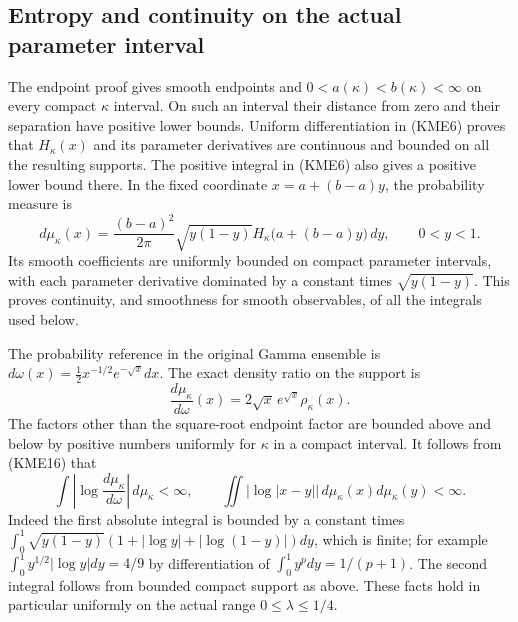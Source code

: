 \documentclass[11pt,a4paper]{article}
\begin{document}
\subsection{Entropy and continuity on the actual parameter interval}
The endpoint proof gives smooth endpoints and $0<a(\kappa)<b(\kappa)<\infty$
on every compact $\kappa$ interval. On such an interval their distance from
zero and their separation have positive lower bounds. Uniform
differentiation in (KME6) proves that $H_\kappa(x)$ and its parameter
derivatives are continuous and bounded on all the resulting supports.
The positive integral in (KME6) also gives a positive lower bound there.
In the fixed coordinate $x=a+(b-a)y$, the probability measure is
\begin{equation}\tag{KME16}
 d\mu_\kappa(x)=\frac{(b-a)^2}{2\pi}\sqrt{y(1-y)}
           H_\kappa\bigl(a+(b-a)y\bigr)\,dy,\qquad 0<y<1.
\end{equation}
Its smooth coefficients are uniformly bounded on compact parameter
intervals, with each parameter derivative dominated by a constant times
$\sqrt{y(1-y)}$.  This proves continuity, and smoothness for smooth
observables, of all the integrals used below.

The probability reference in the original Gamma ensemble is
$d\omega(x)=\tfrac12x^{-1/2}e^{-\sqrt x}dx$.
The exact density ratio on the support is
\begin{equation}\tag{KME17}
 \frac{d\mu_\kappa}{d\omega}(x)=2\sqrt x\,e^{\sqrt x}\rho_\kappa(x).
\end{equation}
The factors other than the square-root endpoint factor are bounded
above and below by positive numbers uniformly for $\kappa$ in a compact
interval.  It follows from (KME16) that
\[
 \int\left|\log\frac{d\mu_\kappa}{d\omega}\right|\,d\mu_\kappa<\infty,
 \qquad
 \iint|\log|x-y||\,d\mu_\kappa(x)d\mu_\kappa(y)<\infty.
\]
Indeed the first absolute integral is bounded by a constant times
$\int_0^1\sqrt{y(1-y)}
(1+|\log y|+|\log(1-y)|)dy$, which is finite; for example
$\int_0^1y^{1/2}|\log y|dy=4/9$ by differentiation of
$\int_0^1y^pdy=1/(p+1)$. The second integral follows from bounded
compact support as above. These facts hold in particular uniformly
on the actual range $0\leq\lambda\leq1/4$.
\end{document}
